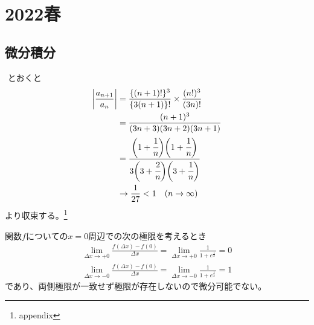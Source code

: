 \newpage
\section{2022春}

\setcounter{yearcounter}{2022}


\subsection{微分積分}
\begin{ans*}
  ${}$
  とおくと
  \begin{align}
    \left| \frac{a_{n+1}}{a_{n}} \right|
    &= \frac{\{(n+1)!\}^3}{\{3(n+1)\}!} \times \frac{(n!)^3}{(3n)!} \\
    &= \frac{(n+1)^3}{(3n+3)(3n+2)(3n+1)} \\
    &= \frac{\biggl(1+\cfrac{1}{n}\biggr)\biggl(1+\cfrac{1}{n}\biggr)}
    {3\biggl(3+\cfrac{2}{n}\biggr)\biggl(3+\cfrac{1}{n}\biggr)} \\
    &\to \frac{1}{27} < 1 \quad(n\to\infty)
  \end{align}
  より収束する。\footnote{appendix}
\end{ans*}



\begin{ans*}
  関数$f$についての$x=0$周辺での次の極限を考えるとき
  \begin{align}
    \lim_{\Delta x\to +0}\frac{f(\Delta x) - f(0)}{\Delta x}
    = \lim_{\Delta x\to +0}\frac{1}{1+e^{\frac{1}{x}}}
    = 0 \\
    \lim_{\Delta x\to -0}\frac{f(\Delta x) - f(0)}{\Delta x}
    = \lim_{\Delta x\to -0}\frac{1}{1+e^{\frac{1}{x}}}
    = 1
  \end{align}
  であり、両側極限が一致せず極限が存在しないので微分可能でない。
\end{ans*}


